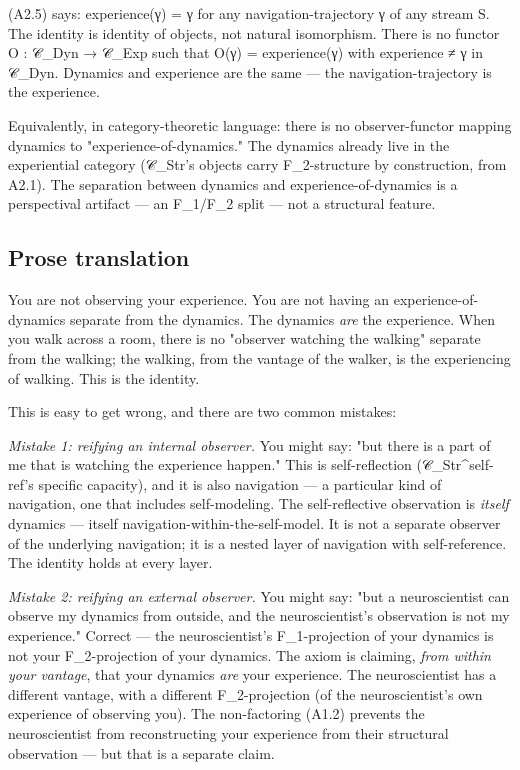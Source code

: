 \documentclass[11pt, openany]{book}
\begin{document}
(A2.5) says: experience(γ) = γ for any navigation-trajectory γ of any stream S. The identity is identity of objects, not natural isomorphism. There is no functor O : 𝒞\_\allowbreak{}Dyn → 𝒞\_\allowbreak{}Exp such that O(γ) = experience(γ) with experience ≠ γ in 𝒞\_\allowbreak{}Dyn. Dynamics and experience are the same --- the navigation-trajectory is the experience.

Equivalently, in category-theoretic language: there is no observer-functor mapping dynamics to "experience-of-dynamics." The dynamics already live in the experiential category (𝒞\_\allowbreak{}Str's objects carry F\_\allowbreak{}2-structure by construction, from A2.1). The separation between dynamics and experience-of-dynamics is a perspectival artifact --- an F\_\allowbreak{}1/F\_\allowbreak{}2 split --- not a structural feature.

\subsection{Prose translation}

You are not observing your experience. You are not having an experience-of-dynamics separate from the dynamics. The dynamics \textit{are} the experience. When you walk across a room, there is no "observer watching the walking" separate from the walking; the walking, from the vantage of the walker, is the experiencing of walking. This is the identity.

This is easy to get wrong, and there are two common mistakes:

\textit{Mistake 1: reifying an internal observer.} You might say: "but there is a part of me that is watching the experience happen." This is self-reflection (𝒞\_\allowbreak{}Str\textasciicircum{}self-ref's specific capacity), and it is also navigation --- a particular kind of navigation, one that includes self-modeling. The self-reflective observation is \textit{itself} dynamics --- itself navigation-within-the-self-model. It is not a separate observer of the underlying navigation; it is a nested layer of navigation with self-reference. The identity holds at every layer.

\textit{Mistake 2: reifying an external observer.} You might say: "but a neuroscientist can observe my dynamics from outside, and the neuroscientist's observation is not my experience." Correct --- the neuroscientist's F\_\allowbreak{}1-projection of your dynamics is not your F\_\allowbreak{}2-projection of your dynamics. The axiom is claiming, \textit{from within your vantage}, that your dynamics \textit{are} your experience. The neuroscientist has a different vantage, with a different F\_\allowbreak{}2-projection (of the neuroscientist's own experience of observing you). The non-factoring (A1.2) prevents the neuroscientist from reconstructing your experience from their structural observation --- but that is a separate claim.
\end{document}
